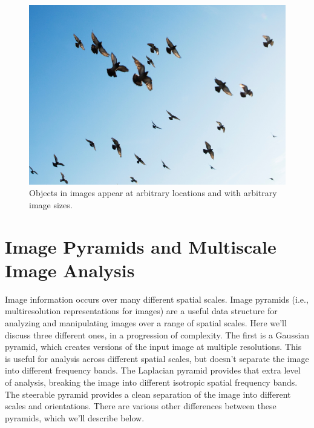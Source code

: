 \begin{figure}[h!]
\centerline{
\includegraphics[width=.8\linewidth]{figures/pyramids/birds_multiscale.jpg}
}
\caption{Objects in images appear at arbitrary locations and with arbitrary image sizes.%
}
\label{fig:birds_multiscale}
\end{figure}



\section{Image Pyramids and Multiscale Image Analysis}

Image information occurs over many different spatial scales.
Image pyramids (i.e., multiresolution representations for images) 
are a
useful data structure for analyzing and manipulating images over a
range of spatial scales.  Here we'll discuss three different ones, in a
progression of complexity. The first is a Gaussian pyramid, which creates versions of the input
image at multiple resolutions.  This is useful for analysis across
different spatial scales, but doesn't separate the image into
different frequency bands.  The Laplacian pyramid provides that extra
level of analysis, breaking the image into different isotropic spatial
frequency bands.  
The
steerable pyramid provides a clean separation of the image into
different scales and orientations.  There are various other
differences between these pyramids, which we'll describe below.


